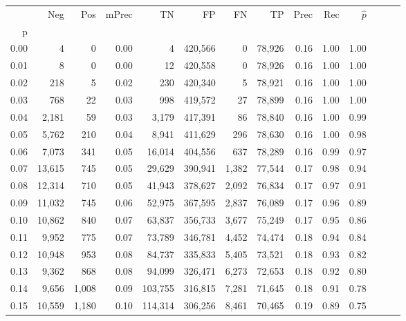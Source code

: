 \begin{tabular}{rrrrrrrrrrrrrr}
\toprule
{} &     Neg &    Pos & mPrec &       TN &       FP &      FN &      TP &  Prec &   Rec & $\hat{p}$ \\
p    &         &        &       &          &          &         &         &       &       &           \\
\midrule
0.00 &       4 &      0 &  0.00 &        4 &  420,566 &       0 &  78,926 &  0.16 &  1.00 &      1.00 \\
0.01 &       8 &      0 &  0.00 &       12 &  420,558 &       0 &  78,926 &  0.16 &  1.00 &      1.00 \\
0.02 &     218 &      5 &  0.02 &      230 &  420,340 &       5 &  78,921 &  0.16 &  1.00 &      1.00 \\
0.03 &     768 &     22 &  0.03 &      998 &  419,572 &      27 &  78,899 &  0.16 &  1.00 &      1.00 \\
0.04 &   2,181 &     59 &  0.03 &    3,179 &  417,391 &      86 &  78,840 &  0.16 &  1.00 &      0.99 \\
0.05 &   5,762 &    210 &  0.04 &    8,941 &  411,629 &     296 &  78,630 &  0.16 &  1.00 &      0.98 \\
0.06 &   7,073 &    341 &  0.05 &   16,014 &  404,556 &     637 &  78,289 &  0.16 &  0.99 &      0.97 \\
0.07 &  13,615 &    745 &  0.05 &   29,629 &  390,941 &   1,382 &  77,544 &  0.17 &  0.98 &      0.94 \\
0.08 &  12,314 &    710 &  0.05 &   41,943 &  378,627 &   2,092 &  76,834 &  0.17 &  0.97 &      0.91 \\
0.09 &  11,032 &    745 &  0.06 &   52,975 &  367,595 &   2,837 &  76,089 &  0.17 &  0.96 &      0.89 \\
0.10 &  10,862 &    840 &  0.07 &   63,837 &  356,733 &   3,677 &  75,249 &  0.17 &  0.95 &      0.86 \\
0.11 &   9,952 &    775 &  0.07 &   73,789 &  346,781 &   4,452 &  74,474 &  0.18 &  0.94 &      0.84 \\
0.12 &  10,948 &    953 &  0.08 &   84,737 &  335,833 &   5,405 &  73,521 &  0.18 &  0.93 &      0.82 \\
0.13 &   9,362 &    868 &  0.08 &   94,099 &  326,471 &   6,273 &  72,653 &  0.18 &  0.92 &      0.80 \\
0.14 &   9,656 &  1,008 &  0.09 &  103,755 &  316,815 &   7,281 &  71,645 &  0.18 &  0.91 &      0.78 \\
0.15 &  10,559 &  1,180 &  0.10 &  114,314 &  306,256 &   8,461 &  70,465 &  0.19 &  0.89 &      0.75 \\

\end{tabular}
